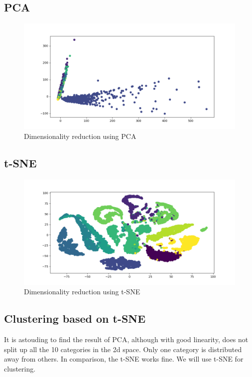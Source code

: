 \documentclass{article}
\begin{document}
{
    \subsection{PCA}
    {
        \begin{figure}[H]
            \centering
            \includegraphics[width = 1\linewidth]{./src3/pca.png}
            \caption{Dimensionality reduction using PCA}
        \end{figure}
    }

    \subsection{t-SNE}
    {
        \begin{figure}[H]
            \centering
            \includegraphics[width = 1\linewidth]{./src3/tsne.png}
            \caption{Dimensionality reduction using t-SNE}
        \end{figure}
    }

    \subsection{Clustering based on t-SNE}
    {
        It is astouding to find the result of PCA, although with good linearity, does not split up all the 10 categories in the 2d space.
        Only one category is distributed away from others. In comparison, the t-SNE works fine. We will use t-SNE for clustering.

}}
\end{document}
